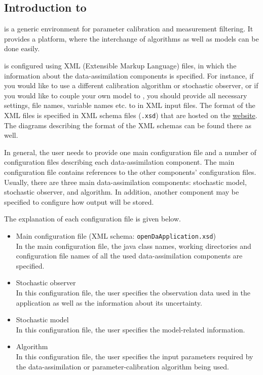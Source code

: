 \subsection{Introduction to \oda}
\oda is a generic environment for parameter calibration and measurement filtering. It provides a platform, where the interchange of algorithms as well as models can be done easily.

\oda is configured using XML (Extensible Markup Language) files, in which the information about the data-assimilation components is specified. For instance, if you would like to use a different calibration algorithm or stochastic observer, or if you would like to couple your own model to \oda, you should provide all necessary settings, file names, variable names etc. to \oda in XML input files. The format of the XML files is specified in XML schema files (\verb|.xsd|) that are hosted on the \href{http://openda.org/docu/openda_2.4/doc/xmlSchemasHTML/index.html}{\oda website}. The diagrams describing the format of the XML schemas can be found there as well. 

In general, the user needs to provide one main configuration file and a number of configuration files describing each data-assimilation component. The main configuration file contains references to the other components’ configuration files. Usually, there are three main data-assimilation components: stochastic model, stochastic observer, and algorithm. In addition, another component may be specified to configure how \oda output will be stored. 

The explanation of each configuration file is given below.

\begin{itemize}
    \item Main configuration file (XML schema: \verb|openDaApplication.xsd|) \\
          In the main configuration file, the \oda java class names, working directories and configuration file names of all the used data-assimilation components are specified.
    \item Stochastic observer \\
		In this configuration file, the user specifies the observation data used in the application as well as the information about its uncertainty.
    \item Stochastic model \\
		In this configuration file, the user specifies the model-related information.
    \item Algorithm \\
		In this configuration file, the user specifies the input parameters required by the data-assimilation or parameter-calibration algorithm being used.
\end{itemize}

